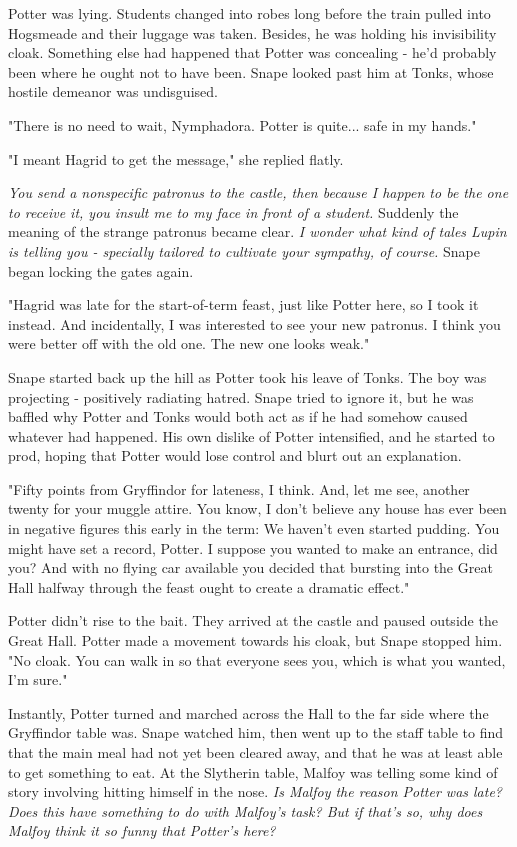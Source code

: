 \documentclass[a4paper,11pt]{article}
\begin{document}
Potter was lying. Students changed into robes long before the train pulled into Hogsmeade and their luggage was taken. Besides, he was holding his invisibility cloak. Something else had happened that Potter was concealing - he'd probably been where he ought not to have been. Snape looked past him at Tonks, whose hostile demeanor was undisguised.

"There is no need to wait, Nymphadora. Potter is quite... safe in my hands."

"I meant Hagrid to get the message," she replied flatly.

\emph{You send a nonspecific patronus to the castle, then because I happen to be the one to receive it, you insult me to my face in front of a student.} Suddenly the meaning of the strange patronus became clear. \emph{I wonder what kind of tales Lupin is telling you - specially tailored to cultivate your sympathy, of course.} Snape began locking the gates again.

"Hagrid was late for the start-of-term feast, just like Potter here, so I took it instead. And incidentally, I was interested to see your new patronus. I think you were better off with the old one. The new one looks weak."

Snape started back up the hill as Potter took his leave of Tonks. The boy was projecting - positively radiating hatred. Snape tried to ignore it, but he was baffled why Potter and Tonks would both act as if he had somehow caused whatever had happened. His own dislike of Potter intensified, and he started to prod, hoping that Potter would lose control and blurt out an explanation.

"Fifty points from Gryffindor for lateness, I think. And, let me see, another twenty for your muggle attire. You know, I don't believe any house has ever been in negative figures this early in the term: We haven't even started pudding. You might have set a record, Potter. I suppose you wanted to make an entrance, did you? And with no flying car available you decided that bursting into the Great Hall halfway through the feast ought to create a dramatic effect."

Potter didn't rise to the bait. They arrived at the castle and paused outside the Great Hall. Potter made a movement towards his cloak, but Snape stopped him. "No cloak. You can walk in so that everyone sees you, which is what you wanted, I'm sure."

Instantly, Potter turned and marched across the Hall to the far side where the Gryffindor table was. Snape watched him, then went up to the staff table to find that the main meal had not yet been cleared away, and that he was at least able to get something to eat. At the Slytherin table, Malfoy was telling some kind of story involving hitting himself in the nose. \emph{Is Malfoy the reason Potter was late? Does this have something to do with Malfoy's task? But if that's so, why does Malfoy think it so funny that Potter's here?}
\end{document}
